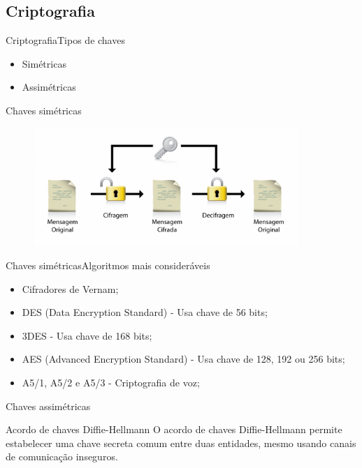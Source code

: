 \documentclass{beamer}
\begin{document}
\subsection{Criptografia}
\begin{frame}{Criptografia}{Tipos de chaves}
\begin{itemize}
\item Sim\'etricas
\item Assim\'etricas
\end{itemize}
\end{frame}
\begin{frame}{Chaves sim\'etricas}
\begin{figure} 
\includegraphics[width=10cm]{Figuras/criptografia_simetrica.png} 
\label{figura:criptografia_simetrica} 
\end{figure}
\end{frame}
\begin{frame}{Chaves sim\'etricas}{Algoritmos mais consider\'aveis}
\begin{itemize}
\item Cifradores de Vernam;
\item DES (Data Encryption Standard) -  Usa chave de 56 bits;
\item 3DES - Usa chave de 168 bits;
\item AES (Advanced Encryption Standard) - Usa chave de 128, 192 ou 256 bits;
\item A5/1, A5/2 e A5/3 - Criptografia de voz;
\end{itemize}
\end{frame}
\begin{frame}{Chaves assim\'etricas}
\begin{block}{Acordo de chaves Diffie-Hellmann}
O acordo de chaves Diffie-Hellmann permite estabelecer uma chave secreta comum entre duas entidades, mesmo usando canais
de comunicação inseguros.
\end{block}
\end{frame}
\end{document}
